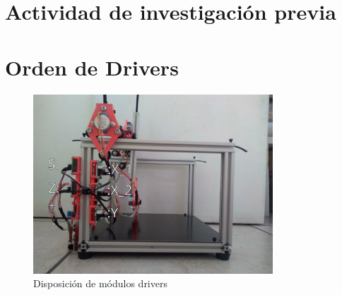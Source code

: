 \documentclass[]{article}
\begin{document}
\section{Actividad de investigación previa}


\section{Orden de Drivers}


\begin{figure}
	\centering
	\includegraphics[width=0.8\textwidth]{DriversLabel}
	\caption{Disposición de módulos drivers}
	\label{fig:circuitoFisico}
\end{figure}





\end{document}
